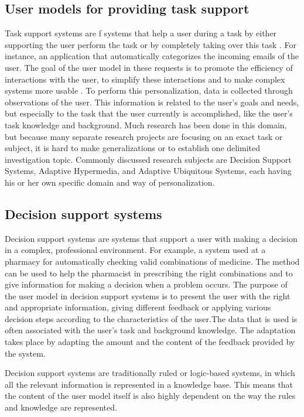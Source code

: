 \subsection{User models for providing task support}

Task support systems are f systems that help a user during a task by either
supporting the user perform the task or by completely taking over this task
\cite{brun2010compass}. For instance,  an application that
automatically categorizes the incoming emails of the user. The goal of the user
model in these requests is to promote the efficiency of interactions with the
user, to simplify these interactions and to make complex systems more usable
\cite{razmerita2009user}\cite{fischer2001user}.
To perform this personalization, data is collected through observations of the
user. This information is related to the user’s goals and needs, but especially
to the task that the user currently is accomplished, like the user’s task
knowledge and background. Much research has been done in this domain, but
because many separate research projects are focusing on an exact task or
subject, it is hard to make generalizations or to establish one delimited
investigation topic. Commonly discussed research subjects are Decision Support
Systems,  Adaptive Hypermedia, and Adaptive Ubiquitous Systems, each having his
or her own specific domain and way of personalization.
\subsection{Decision support systems}

Decision support systems are systems that support a user with making a decision
in a complex, professional environment. For example,  a
system used at a pharmacy for automatically checking valid combinations of
medicine. The method can be used to help the pharmacist in prescribing the right
combinations and to give information for making a decision when a problem
occurs. The purpose of the user model in decision support systems is to present
the user with the right and appropriate information, giving different feedback
or applying various decision steps according to the characteristics of the
user.The data that is used is often associated with the user’s task and
background knowledge. The adaptation takes place by adapting the amount and
the content of the feedback provided by the system.


Decision support systems are traditionally ruled or logic-based systems, in
which all the relevant information is represented in a knowledge base. This
means that the content of the user model itself is also highly dependent on the
way the rules and knowledge are represented.


